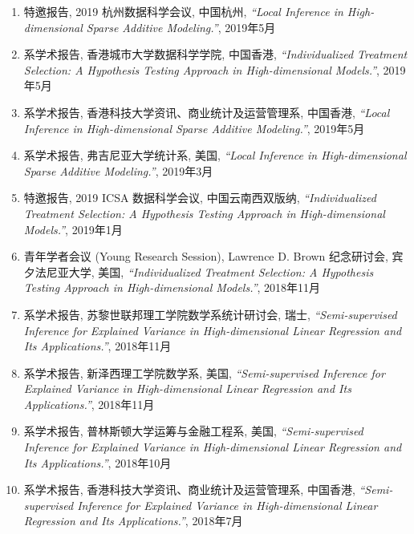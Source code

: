 \documentclass[margin, line]{res}
\begin{document}
\begin{resume}
\begin{enumerate}
            \item 特邀报告, 2019 杭州数据科学会议, 中国杭州, 
                {\it ``Local Inference in High-dimensional Sparse Additive Modeling.''}, 
                2019年5月

            \item 系学术报告, 香港城市大学数据科学学院, 中国香港, 
                {\it ``Individualized Treatment Selection: A Hypothesis Testing Approach in High-dimensional Models.''}, 
                2019年5月

            \item 系学术报告, 香港科技大学资讯、商业统计及运营管理系, 中国香港, 
                {\it ``Local Inference in High-dimensional Sparse Additive Modeling.''}, 2019年5月

            \item 系学术报告, 弗吉尼亚大学统计系, 美国, {\it ``Local Inference in High-dimensional Sparse Additive Modeling.''}, 
                2019年3月

            \item 特邀报告, 2019 ICSA 数据科学会议, 中国云南西双版纳, 
                {\it ``Individualized Treatment Selection: A Hypothesis Testing Approach in High-dimensional Models.''}, 
                2019年1月

			\item 青年学者会议 (Young Research Session), Lawrence D. Brown 纪念研讨会, 宾夕法尼亚大学, 美国,
                {\it ``Individualized Treatment Selection: A Hypothesis Testing Approach in High-dimensional Models.''}, 
                2018年11月

            \item 系学术报告, 苏黎世联邦理工学院数学系统计研讨会, 瑞士, 
                {\it ``Semi-supervised Inference for Explained Variance in High-dimensional Linear Regression and Its Applications.''}, 
                2018年11月

            \item 系学术报告, 新泽西理工学院数学系, 美国, {\it ``Semi-supervised Inference for Explained Variance in High-dimensional Linear Regression and Its Applications.''}, 
                2018年11月

            \item 系学术报告, 普林斯顿大学运筹与金融工程系, 美国, {\it ``Semi-supervised Inference for Explained Variance in High-dimensional Linear Regression and Its Applications.''}, 
                2018年10月

            \item 系学术报告, 香港科技大学资讯、商业统计及运营管理系, 中国香港, 
                {\it ``Semi-supervised Inference for Explained Variance in High-dimensional Linear Regression and Its Applications.''}, 
                2018年7月


\end{enumerate}
\end{resume}
\end{document}
